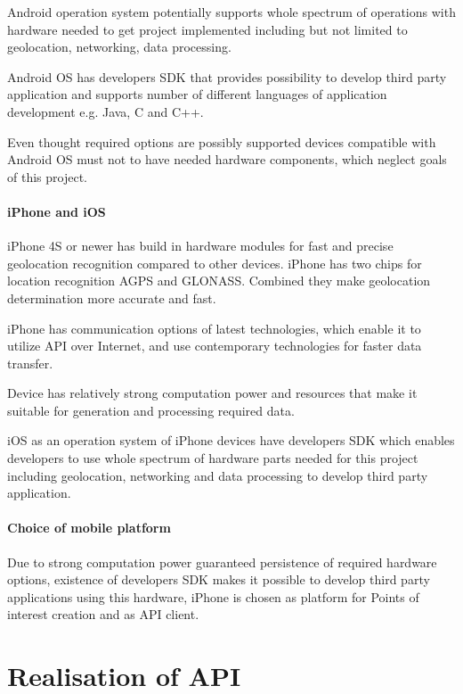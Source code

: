 \documentclass[thesis=M,english]{FITthesis}[2012/10/20]
\begin{document}
Android operation system potentially supports whole spectrum of operations with hardware needed to get project implemented including but not limited to geolocation, networking, data processing. 

Android OS has developers SDK that provides possibility to develop third party application and supports number of different languages of application development e.g. Java, C and C++.

Even thought required options are possibly supported devices compatible with Android OS must not to have needed hardware components, which neglect goals of this project.

\subsubsection{iPhone and iOS}

iPhone 4S or newer has build in hardware modules for fast and precise geolocation recognition compared to other devices. iPhone has two chips for location recognition AGPS and GLONASS. Combined they make geolocation determination more accurate and fast.

iPhone has communication options of latest technologies, which enable it to utilize API over Internet, and use contemporary technologies for faster data transfer. 

Device has relatively strong computation power and resources that make it suitable for generation and processing required data.

iOS as an operation system of iPhone devices have developers SDK which enables developers to use whole spectrum of hardware parts needed for this project including geolocation, networking and data processing to develop third party application.

\subsubsection{Choice of mobile platform}

Due to strong computation power guaranteed persistence of required hardware options, existence of developers SDK makes it possible to develop third party applications using this hardware, iPhone is chosen as platform for Points of interest creation and as API client.


\chapter{Realisation of API}
\end{document}
